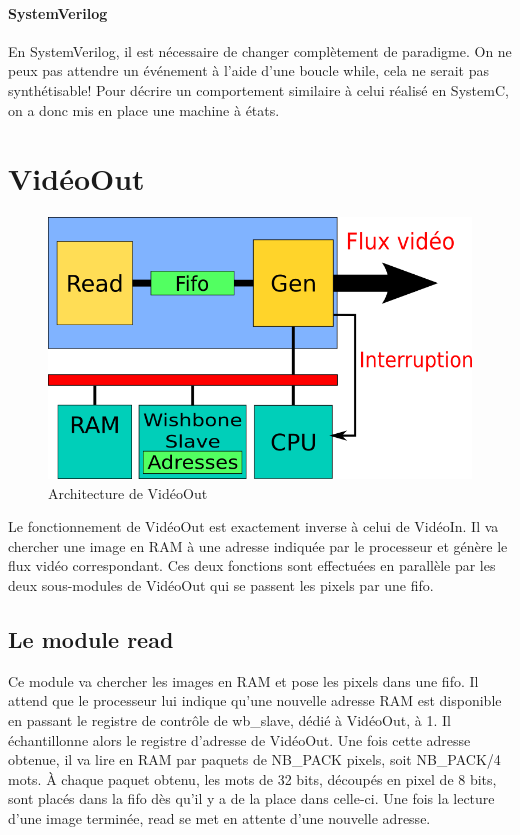 \documentclass[a4paper,12pt]{report}
\begin{document}
\paragraph{SystemVerilog}
En SystemVerilog, il est nécessaire de changer complètement de paradigme. 
On ne peux pas attendre un événement à l'aide d'une boucle while, 
cela ne serait pas synthétisable! 
Pour décrire un comportement similaire à celui réalisé en SystemC, on a donc mis en place une machine à états.




{}

\newpage
 
    \section*{VidéoOut}

\begin{figure}[!h]
	\centering
	\includegraphics[scale = 0.5]{video_out.png}
	\caption{Architecture de VidéoOut}
\end{figure}

Le fonctionnement de VidéoOut est exactement inverse à celui de VidéoIn.
Il va chercher une image en RAM à une adresse indiquée par le processeur
et génère le flux vidéo correspondant. 
Ces deux fonctions sont effectuées en parallèle par les deux sous-modules de VidéoOut qui se passent
les pixels par une fifo.

\subsection{Le module read}
Ce module va chercher les images en RAM et pose les pixels dans une fifo. 
Il attend que le processeur lui indique qu'une nouvelle adresse RAM est disponible en passant le registre de contrôle de wb\_slave, dédié à VidéoOut, à 1.
Il échantillonne alors le registre d'adresse de VidéoOut.
Une fois cette adresse obtenue, il va lire en RAM par paquets de NB\_PACK pixels, soit NB\_PACK/4 mots.
À chaque paquet obtenu, les mots de 32 bits, découpés en pixel de 8 bits, sont placés dans la fifo dès qu'il y a de la place dans celle-ci.
Une fois la lecture d'une image terminée, read se met en attente d'une nouvelle adresse.
\end{document}
